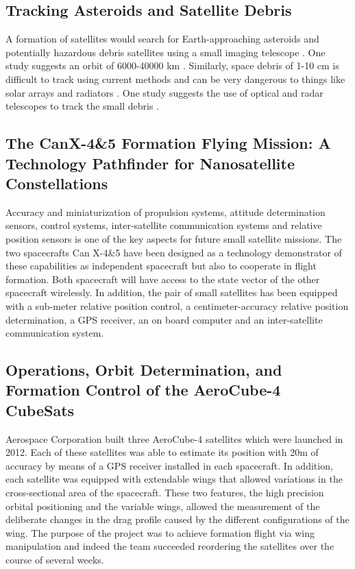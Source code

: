 \subsection{Tracking Asteroids and Satellite Debris }

A formation of satellites would search for Earth-approaching asteroids
and potentially hazardous debris satellites using a small imaging
telescope \cite{Ref:Carroll}. One study suggests an orbit of 6000-40000
km \cite{Ref:Leitch}.  Similarly, space debris of 1-10 cm is difficult to track using current
methods and can be very dangerous to things like solar arrays and
radiators \cite{Ref:Guerrero}. One study suggests the use of optical
and radar telescopes to track the small debris \cite{Ref:Tolkachev}.

\subsection{The CanX-4\&5 Formation Flying Mission: A Technology Pathfinder for Nanosatellite Constellations}

Accuracy and miniaturization of propulsion systems, attitude determination
sensors, control systems, inter-satellite communication systems and
relative position sensors is one of the key aspects for future small
satellite missions. The two spacecrafts Can X-4\&5 have been designed
as a technology demonstrator of these capabilities as independent
spacecraft but also to cooperate in flight formation. Both spacecraft
will have access to the state vector of the other spacecraft wirelessly.
In addition, the pair of small satellites has been equipped with a
sub-meter relative position control, a centimeter-accuracy relative
position determination, a GPS receiver, an on board computer and an
inter-satellite communication system.\cite{Bonin_FF_CanX-4&5}

\subsection{Operations, Orbit Determination, and Formation Control of the AeroCube-4 CubeSats}

Aerospace Corporation built three AeroCube-4 satellites which were launched in 2012. Each of these satellites was able
to estimate its position with 20m of accuracy by means of a GPS receiver
installed in each spacecraft. In addition, each satellite was equipped
with extendable wings that allowed variations in the cross-sectional
area of the spacecraft. These two features, the high precision orbital
positioning and the variable wings, allowed the measurement of the deliberate
changes in the drag profile caused by the different configurations
of the wing. The purpose of the project was to achieve formation
flight via wing manipulation and indeed the team succeeded reordering
the satellites over the course of several weeks.\cite{Gangestad_FF_AeroForces}

